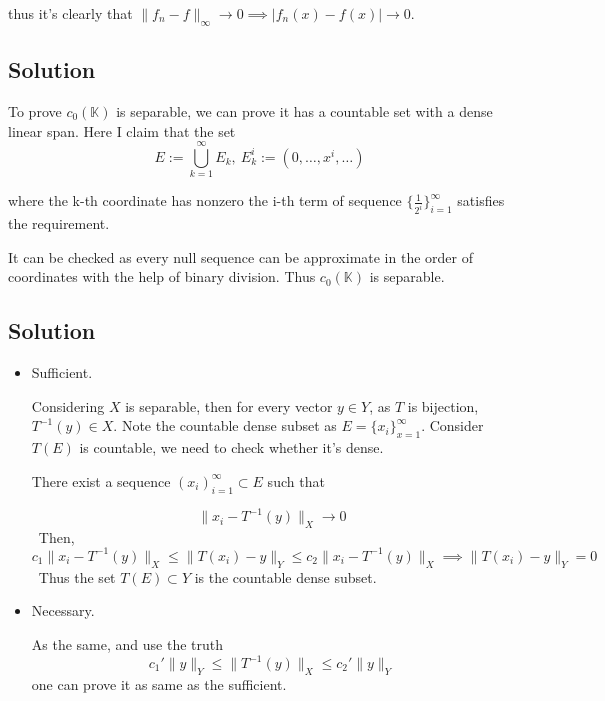 \documentclass{article}
\begin{document}
thus it's clearly that \(\|f_n - f\|_{\infty} \to 0 \implies |f_n(x) - f(x)| \to 0\).



\subsection{Solution}
To prove \(c_0(\mathbb K)\) is separable, we can prove it has a countable set with a dense linear span. Here I claim that the set
\[E := \bigcup_{k = 1}^\infty E_k,\ E_k^i := (0, \ldots, x^i, \ldots)\]

where the k-th coordinate has nonzero the i-th term of sequence \(\{\frac{1}{2^i}\}_{i = 1}^\infty\) satisfies the requirement.

It can be checked as every null sequence can be approximate in the order of coordinates with the help of binary division. Thus \(c_0(\mathbb K)\) is separable.

\subsection{Solution}
\begin{itemize}
    \item Sufficient.
    
    Considering \(X\) is separable, then for every vector \(y \in Y\), as \(T\) is bijection, \(T^{-1}(y) \in X\). Note the countable dense subset as \(E = \{x_i\}_{x = 1}^\infty\). Consider \(T(E)\) is countable, we need to check whether it's dense.
    
    There exist a sequence \((x_i)_{i = 1}^{\infty} \subset E\) such that
    
    \[\|x_i - T^{-1}(y)\|_X \to 0\]
    \
    Then,
    \[c_1 \|x_i - T^{-1}(y)\|_X \le \|T(x_i) - y\|_Y \le c_2 \|x_i - T^{-1}(y)\|_X \implies \|T(x_i) - y\|_Y = 0\]
    \
    Thus the set \(T(E) \subset Y\) is the countable dense subset.

    \item Necessary.
    
    As the same, and use the truth
    \[c_1' \|y\|_Y \le \|T^{-1}(y)\|_X \le c_2' \|y\|_Y \]
    one can prove it as same as the sufficient.
\end{itemize}

\subsection{}

\subsection{}
\end{document}
